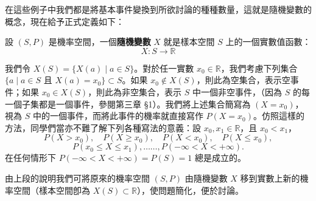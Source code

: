 在這些例子中我們都是將基本事件變換到所欲討論的種種數量，這就是隨機變數的概念，現在給予正式定義如下：

\medskip
\begin{definition*}
設 $(S, P)$ 是機率空間，一個\textbf{隨機變數} $X$ 就是樣本空間 $S$ 上的一個實數值函數：
\[
X \colon S \longrightarrow \mathbb{R}
\]
\end{definition*}
我們令 $X(S) = \{X(a) \mid a \in S\}$。對於任一實數 $x_0 \in \mathbb{R}$，我們考慮下列集合 $\{a \mid a \in S \text{ 且 } X(a) = x_0\} \subset S$。如果 $x_0 \notin X(S)$，則此為空集合，表示空事件；如果 $x_0 \in X(S)$，則此為非空集合，表示 $S$ 中一個非空事件，（因為 $S$ 的每一個子集都是一個事件，參閱第三章 §1）。我們將上述集合簡寫為 $(X = x_0)$，視為 $S$ 中的一個事件，而將此事件的機率就直接寫作 $P(X = x_0)$。仿照這樣的方法，同學們當亦不難了解下列各種寫法的意義：設 $x_0, x_1 \in \mathbb{R}$，且 $x_0 < x_1$，
\[
P(X > x_0), \quad P(X \ge x_0), \quad P(X < x_0), \quad P(X \le x_0),
\]
\[
P(x_0 \le X \le x_1), \dots\dots, P(-\infty < X < +\infty).
\]
在任何情形下 $P(-\infty < X < +\infty) = P(S) = 1$ 總是成立的。

由上段的說明我們可將原來的機率空間 $(S, P)$ 由隨機變數 $X$ 移到實數上新的機率空間（樣本空間卽為 $X(S) \subset \mathbb{R}$），使問題簡化，便於討論。

